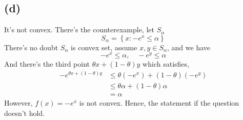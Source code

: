 \documentclass[12pt, a4 paper]{article}
\begin{document}
\begin{framed}
        \subsection{(d)}
            It's not convex. There's the counterexample, let $S_{\alpha}$
            $$
            S_{\alpha} = \left\{ 
                x: -e^{x} \leq \alpha
            \right\}
            $$
            \indent There's no doubt $S_{\alpha}$ is convex set, assume $x,y \in S_{\alpha}$, and we have
            $$
            -e^{x} \leq \alpha, \quad
            -e^{y} \leq \alpha
            $$
            \indent And there's the third point $\theta x + (1-\theta) y$ which satisfies,
            \begin{align*}
                -e^{\theta x + (1-\theta) y} &\leq \theta (-e^{x}) + (1-\theta) (-e^{y})\\
                &\leq \theta \alpha + (1-\theta) \alpha \\
                &=\alpha
            \end{align*}
            \indent However, $f(x) = -e^{x}$ is not convex. Hence, the statement if the question
            doesn't hold.
    \end{framed}
\end{document}
